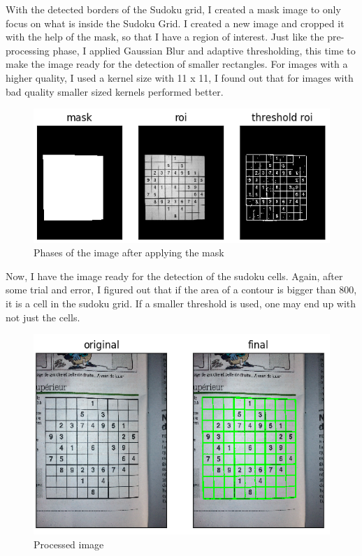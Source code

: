 With the detected borders of the Sudoku grid, I created a mask image to only focus on what is inside the Sudoku Grid. I created a new image and cropped it with the help of the mask, so that I have a region of interest. Just like the pre-processing phase, I applied Gaussian Blur and adaptive thresholding, this time to make the image ready for the detection of smaller rectangles. For images with a higher quality, I used a kernel size with 11 x 11, I found out that for images with bad quality smaller sized kernels performed better.

\begin{figure}[H]
    \centering
    \includegraphics[width=\textwidth]{images/masked.png}
    \caption{Phases of the image after applying the mask}
    \setlength{\belowcaptionskip}{-20pt}
    \setlength{\abovecaptionskip}{-20pt}
\end{figure}

Now, I have the image ready for the detection of the sudoku cells. Again, after some trial and error, I figured out that if the area of a contour is bigger than 800, it is a cell in the sudoku grid. If a smaller threshold is used, one may end up with not just the cells.

\begin{figure}[H]
    \centering
    \includegraphics[width=\textwidth]{images/final.png}
    \caption{Processed image}
    \setlength{\belowcaptionskip}{-20pt}
    \setlength{\abovecaptionskip}{-20pt}
\end{figure}

